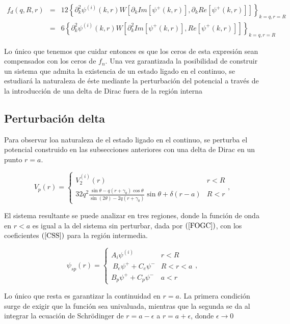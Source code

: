 \begin{eqnarray*}
	f_d(q,R,r) &=&  12 \left \{\partial^2_k \psi^{(i)}(k,r) W\left[\partial_k Im[\psi^{+}(k,r)], \partial_k Re[\psi^{+}(k,r)] \right] \right \}
_{k=q, r=R}
\\
&=&6 \left\{\partial^2_{k} \psi^{(i)}(k,r)W[\partial^2_k Im[\psi^{+}(k,r)],  Re[\psi^{+}(k,r)]] \right\}_{k=q, r=R}
\end{eqnarray*} 

Lo único que tenemos que cuidar entonces es que los ceros de esta expresión sean compensados con los ceros de $f_n$. Una vez garantizada la posibilidad de construir un sistema que admita la existencia de un estado ligado en el continuo, se estudiará la naturaleza de éste mediante la perturbación del potencial a través de la introducción de una delta de Dirac fuera de la región interna 

\subsection{Perturbación delta}

Para observar loa naturaleza de el estado ligado en el continuo, se perturba el potencial construido en las subsecciones anteriores con una delta de Dirac en un punto $r=a$.

\begin{equation}
V_p(r)=\begin{cases}
V_2^{(i)}(r) & r < R
\\ 
32 q^2   \frac{\sin\theta-q(r+\gamma_0)\cos\theta}{\sin(2\theta)-2q(r+\gamma_0)}\sin\theta + \delta(r - a)& R < r
\end{cases},\label{PDP}
\end{equation}

El sistema resultante se puede analizar en tres regiones, donde la función de onda en  $r<a$ es igual a la del sistema sin perturbar, dada por $(\ref{FOGC})$, con los coeficientes $(\ref{CSS})$ para la región intermedia.

\begin{equation}
\psi_{sp}(r)=\begin{cases}
A_i \psi^{(i)} & r < R
\\\ B_e \psi^{+} + C_e \psi^{-} & R < r < a
\\ B_p \psi^{+} + C_p \psi^{-} & a < r
\end{cases},\label{FOGSP}
\end{equation}


Lo único que resta es garantizar la continuidad en $r=a$. La primera condición surge de exigir que la función sea univaluada, mientras que la segunda se da al integrar la ecuación de Schrödinger de $r = a - \epsilon$ a $r = a + \epsilon$, donde $\epsilon \to 0$ 

